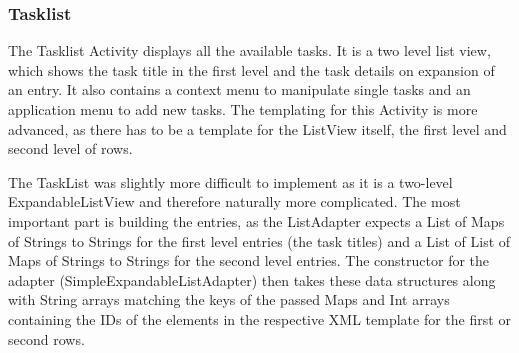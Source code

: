
\subsubsection{Tasklist} %
\label{ssub:Tasklist}
The Tasklist Activity displays all the available tasks. It is a two level
list view, which shows the task title in the first level and the task details
on expansion of an entry. It also contains a context menu to manipulate single
tasks and an application menu to add new tasks. The templating for this
Activity is more advanced, as there has to be a template for the ListView
itself, the first level and second level of rows.

The TaskList was slightly more difficult to implement as it is a two-level
ExpandableListView and therefore naturally more complicated. The most important
part is building the entries, as the ListAdapter expects a List of Maps of
Strings to Strings for the first level entries (the task titles) and a List
of List of Maps of Strings to Strings for the second level entries. The
constructor for the adapter (SimpleExpandableListAdapter) then takes these
data structures along with String arrays matching the keys of the passed Maps
and Int arrays containing the IDs of the elements in the respective XML
template for the first or second rows.


